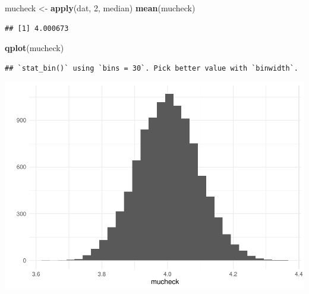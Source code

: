 \documentclass[
]{article}
\newenvironment{Shaded}{\begin{snugshade}}{\end{snugshade}}
\newcommand{\DecValTok}[1]{\textcolor[rgb]{0.00,0.00,0.81}{#1}}
\newcommand{\KeywordTok}[1]{\textcolor[rgb]{0.13,0.29,0.53}{\textbf{#1}}}
\newcommand{\NormalTok}[1]{#1}
\newcommand{\StringTok}[1]{\textcolor[rgb]{0.31,0.60,0.02}{#1}}
\begin{document}
\begin{Shaded}
\begin{Highlighting}[]
\NormalTok{mucheck <-}\StringTok{ }\KeywordTok{apply}\NormalTok{(dat, }\DecValTok{2}\NormalTok{, median)}
\KeywordTok{mean}\NormalTok{(mucheck)}
\end{Highlighting}
\end{Shaded}

\begin{verbatim}
## [1] 4.000673
\end{verbatim}

\begin{Shaded}
\begin{Highlighting}[]
\KeywordTok{qplot}\NormalTok{(mucheck)}
\end{Highlighting}
\end{Shaded}

\begin{verbatim}
## `stat_bin()` using `bins = 30`. Pick better value with `binwidth`.
\end{verbatim}

\includegraphics{matstatproblems20-21_files/figure-latex/unnamed-chunk-132-1.pdf}
\end{document}
